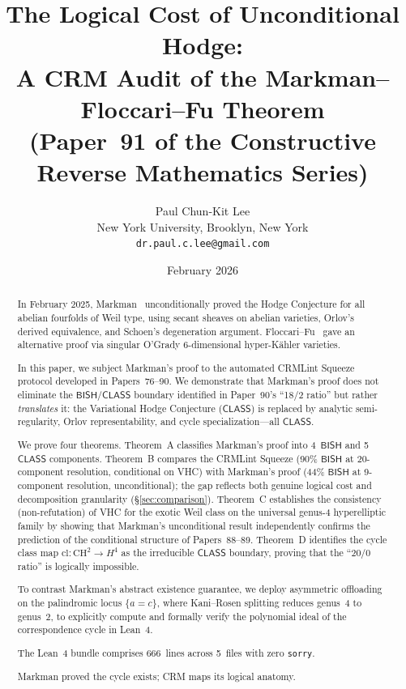 \documentclass[11pt]{article}
\title{The Logical Cost of Unconditional Hodge:\\
  A CRM Audit of the Markman--Floccari--Fu Theorem\\[6pt]
  \large (Paper~91 of the Constructive Reverse Mathematics Series)}
\author{Paul Chun-Kit Lee \\[2pt]
\normalsize New York University, Brooklyn, New York \\[2pt]
\normalsize \texttt{dr.paul.c.lee@gmail.com}}
\date{February 2026}
\theoremstyle{plain}
\theoremstyle{definition}
\theoremstyle{remark}
\newcommand{\CH}{\mathrm{CH}}
\newcommand{\BISH}{\mathsf{BISH}}
\newcommand{\CLASS}{\mathsf{CLASS}}
\begin{document}
\maketitle


\begin{abstract}
In February 2025, Markman~\cite{markman2025} unconditionally proved
the Hodge Conjecture for all abelian fourfolds of Weil type, using
secant sheaves on abelian varieties, Orlov's derived equivalence,
and Schoen's degeneration argument.  Floccari--Fu~\cite{floccari-fu2025}
gave an alternative proof via singular O'Grady 6-dimensional
hyper-K\"ahler varieties.

In this paper, we subject Markman's proof to the automated CRMLint
Squeeze protocol developed in Papers~76--90.  We demonstrate that
Markman's proof does not eliminate the $\BISH/\CLASS$ boundary
identified in Paper~90's ``18/2 ratio'' but rather \emph{translates}
it: the Variational Hodge Conjecture ($\CLASS$) is replaced by
analytic semi-regularity, Orlov representability, and cycle
specialization---all $\CLASS$.

We prove four theorems.  Theorem~A classifies Markman's proof into
4~$\BISH$ and 5~$\CLASS$ components.  Theorem~B compares the CRMLint
Squeeze (90\% $\BISH$ at 20-component resolution, conditional on VHC)
with Markman's proof (44\% $\BISH$ at 9-component resolution,
unconditional); the gap reflects both genuine logical cost and
decomposition granularity (\S\ref{sec:comparison}).  Theorem~C establishes the consistency (non-refutation) of VHC for
the exotic Weil class on the universal genus-4 hyperelliptic family
by showing that Markman's unconditional result independently confirms
the prediction of the conditional structure of Papers~88--89.  Theorem~D identifies the cycle class map
$\mathrm{cl}: \CH^2 \to H^4$ as the irreducible $\CLASS$ boundary,
proving that the ``20/0 ratio'' is logically impossible.

To contrast Markman's abstract existence guarantee, we deploy
asymmetric offloading on the palindromic locus $\{a = c\}$, where
Kani--Rosen splitting reduces genus~4 to genus~2, to explicitly
compute and formally verify the polynomial ideal of the
correspondence cycle in Lean~4.

The Lean~4 bundle comprises 666~lines across 5~files with zero
\texttt{sorry}.

Markman proved the cycle exists; CRM maps its logical anatomy.
\end{abstract}
\end{document}
